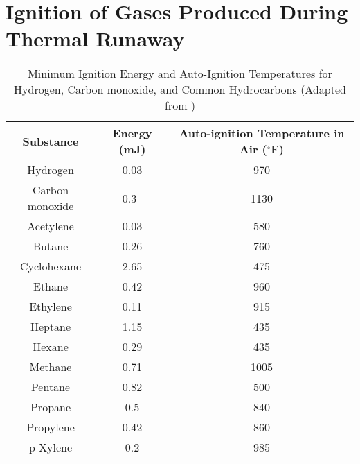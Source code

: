 \documentclass[12pt,oneside]{book}
\begin{document}
\chapter{Ignition of Gases Produced During Thermal Runaway}
\label{chap:appendix_a}


\begin{table}[!ht]
	\centering
	\caption[Minimum ignition energy for hydrogen and common hydrocarbons]{Minimum Ignition Energy and Auto-Ignition Temperatures for Hydrogen, Carbon monoxide, and Common Hydrocarbons (Adapted from \cite{ignition_handbook})}
	\begin{tabular}{|c||c|c|}
		\hline
		Substance	& Energy (mJ) 	& Auto-ignition Temperature in Air ($^{\circ}$F)\\ \hline \hline
		Hydrogen		 	& 0.03	& 970 	\\ \hline
		Carbon monoxide	 	& 0.3~\cite{ILO:2017}	& 1130 	\\ \hline
		Acetylene  			& 0.03	& 580 	\\ \hline
		Butane  			& 0.26	& 760	\\ \hline
		Cyclohexane  		& 2.65	& 475 	\\ \hline
		Ethane  			& 0.42	& 960 	\\ \hline
		Ethylene		  	& 0.11	& 915 	\\ \hline
		Heptane  			& 1.15	& 435 	\\ \hline
		Hexane  			& 0.29	& 435 	\\ \hline
		Methane			  	& 0.71	& 1005 	\\ \hline
		Pentane  			& 0.82	& 500 	\\ \hline
		Propane  			& 0.5	& 840 	\\ \hline
		Propylene		  	& 0.42	& 860 	\\ \hline
		p-Xylene  			& 0.2	& 985 	\\ \hline
	\end{tabular}
\label{tab:ignition_energy}
\end{table}
\end{document}

